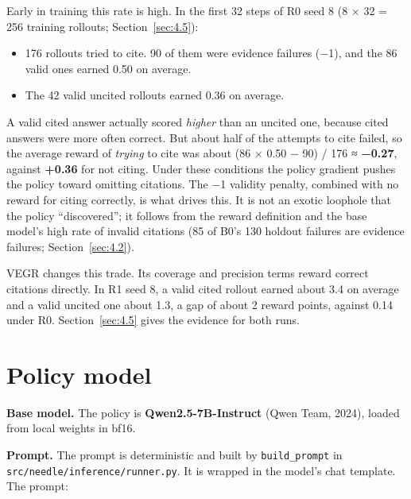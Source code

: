 Early in training this rate is high. In the first 32 steps of R0 seed 8
(8 × 32 = 256 training rollouts; Section~\ref{sec:4.5}):

\begin{itemize}
\tightlist
\item
  176 rollouts tried to cite. 90 of them were evidence failures (−1),
  and the 86 valid ones earned 0.50 on average.
\item
  The 42 valid uncited rollouts earned 0.36 on average.
\end{itemize}

A valid cited answer actually scored \emph{higher} than an uncited one,
because cited answers were more often correct. But about half of the
attempts to cite failed, so the average reward of \emph{trying} to cite
was about (86 × 0.50 − 90) / 176 ≈ \textbf{−0.27}, against
\textbf{+0.36} for not citing. Under these conditions the policy
gradient pushes the policy toward omitting citations. The −1 validity
penalty, combined with no reward for citing correctly, is what drives
this. It is not an exotic loophole that the policy ``discovered''; it
follows from the reward definition and the base model's high rate of
invalid citations (85 of B0's 130 holdout failures are evidence
failures; Section~\ref{sec:4.2}).

VEGR changes this trade. Its coverage and precision terms reward correct
citations directly. In R1 seed 8, a valid cited rollout earned about 3.4
on average and a valid uncited one about 1.3, a gap of about 2 reward
points, against 0.14 under R0. Section~\ref{sec:4.5} gives the evidence
for both runs.

\section{Policy model}\label{sec:3.5}

\textbf{Base model.} The policy is \textbf{Qwen2.5-7B-Instruct} (Qwen
Team, 2024), loaded from local weights in bf16.

\textbf{Prompt.} The prompt is deterministic and built by
\texttt{build\_\allowbreak{}prompt} in
\texttt{src/\allowbreak{}needle/\allowbreak{}inference/\allowbreak{}runner.\allowbreak{}py}.
It is wrapped in the model's chat template. The prompt:

